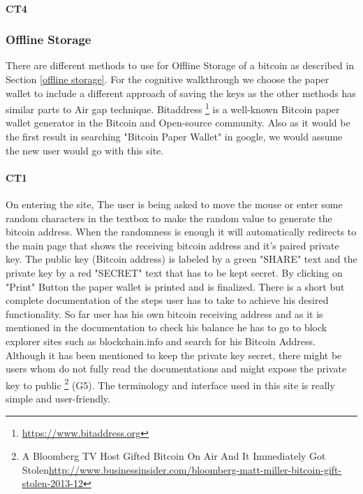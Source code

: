 \paragraph{CT4} 


\subsubsection{Offline Storage}
There are different methods to use for Offline Storage of a bitcoin as described in Section \ref{offline storage}. For the cognitive walkthrough we choose the paper wallet to include a different approach of saving the keys as the other methods has similar parts to Air gap technique. Bitaddress \footnote{\url{https://www.bitaddress.org}} is a well-known Bitcoin paper wallet generator in the Bitcoin and Open-source community. Also as it would be the first result in searching "Bitcoin Paper Wallet" in google, we would assume the new user would go with this site.\\

\paragraph{CT1} On entering the site, The user is being asked to move the mouse or enter some random characters in the textbox to make the random value to generate the bitcoin address. When the randomness is enough it will automatically redirects to the main page that shows the receiving bitcoin address and it's paired private key. The public key (Bitcoin address) is labeled by a green "SHARE" text and the private key by a red "SECRET" text that has to be kept secret. By clicking on "Print" Button the paper wallet is printed and is finalized. There is a short but complete documentation of the steps user has to take to achieve his desired functionality. So far user has his own bitcoin receiving address and as it is mentioned in the documentation to check his balance he has to go to block explorer sites such as blockchain.info and search for his Bitcoin Address. Although it has been mentioned to keep the private key secret, there might be users whom do not fully read the documentations and might expose the private key to public \footnote{A Bloomberg TV Host Gifted Bitcoin On Air And It Immediately Got Stolen\url{http://www.businessinsider.com/bloomberg-matt-miller-bitcoin-gift-stolen-2013-12}} (G5). The terminology and interface used in this site is really simple and user-friendly.

